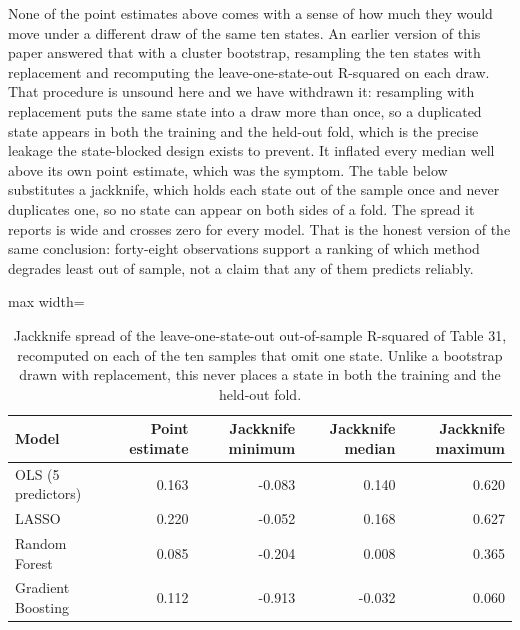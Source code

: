 \documentclass[12pt,a4paper]{article}
\begin{document}
None of the point estimates above comes with a sense of how much they would move under a different draw of the same ten states. An earlier version of this paper answered that with a cluster bootstrap, resampling the ten states with replacement and recomputing the leave-one-state-out R-squared on each draw. That procedure is unsound here and we have withdrawn it: resampling with replacement puts the same state into a draw more than once, so a duplicated state appears in both the training and the held-out fold, which is the precise leakage the state-blocked design exists to prevent. It inflated every median well above its own point estimate, which was the symptom. The table below substitutes a jackknife, which holds each state out of the sample once and never duplicates one, so no state can appear on both sides of a fold. The spread it reports is wide and crosses zero for every model. That is the honest version of the same conclusion: forty-eight observations support a ranking of which method degrades least out of sample, not a claim that any of them predicts reliably.

\begin{table}[H]
\centering
\addtocounter{table}{-1}\renewcommand{\thetable}{\arabic{table}a}
\caption{Jackknife spread of the leave-one-state-out out-of-sample R-squared of Table 31, recomputed on each of the ten samples that omit one state. Unlike a bootstrap drawn with replacement, this never places a state in both the training and the held-out fold.}
\label{tab:31a}
\renewcommand{\thetable}{\arabic{table}}
\footnotesize
\begin{adjustbox}{max width=\textwidth}
\begin{tabular}{@{}lrrrr@{}}
\toprule
Model & Point estimate & Jackknife minimum & Jackknife median & Jackknife maximum \\
\midrule
OLS (5 predictors) & 0.163 & -0.083 & 0.140 & 0.620 \\
LASSO & 0.220 & -0.052 & 0.168 & 0.627 \\
Random Forest & 0.085 & -0.204 & 0.008 & 0.365 \\
Gradient Boosting & 0.112 & -0.913 & -0.032 & 0.060 \\
\bottomrule
\end{tabular}
\end{adjustbox}
\end{table}
\end{document}

